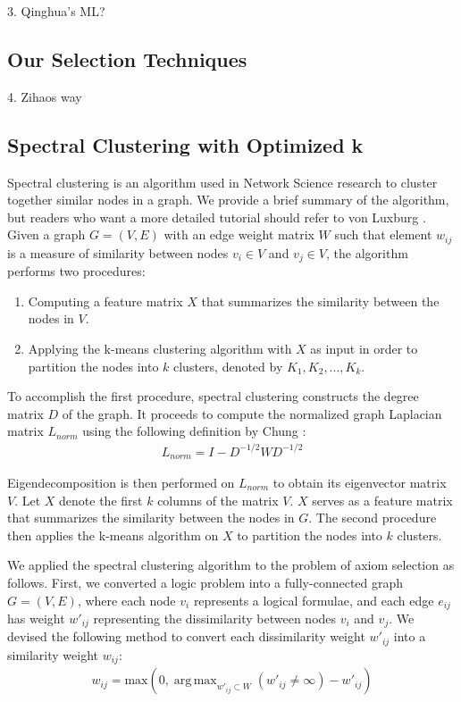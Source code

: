 \documentclass[EPiC]{easychair}
\DeclareMathOperator*{\argmaxA}{arg\,max} %
\begin{document}
3. Qinghua's ML?
\subsection{Our Selection Techniques}
\label{Zihao}

4. Zihaos way
\subsection{Spectral Clustering with Optimized k}
\label{Zishi}

Spectral clustering is an algorithm used in Network Science research to
cluster together similar nodes in a graph. We provide a brief summary of the
algorithm, but readers who want a more detailed tutorial should refer to
von Luxburg \cite{vonLuxburg2007}. 
Given a graph $G = (V, E)$ with an edge weight matrix $W$ such that element
$w_{ij}$ is a measure of similarity between nodes $v_{i} \in V$ and 
$v_{j} \in V$, the algorithm performs two procedures:
\begin{enumerate}
\item Computing a feature matrix $X$ that summarizes the similarity 
between the nodes in $V$.

\item Applying the k-means clustering algorithm with $X$ as input in order 
to partition the nodes into $k$ clusters, denoted by
$K_{1}, K_{2}, ..., K_{k}$.
\end{enumerate}

To accomplish the first procedure, spectral clustering constructs the 
degree matrix $D$ of the graph. It proceeds to compute the normalized 
graph Laplacian matrix $L_{norm}$ using the following definition by 
Chung \cite{Chung1997}:
\begin{align}
L_{norm} = I - D^{-1/2} W D^{-1/2}
\end{align}

Eigendecomposition is then performed on $L_{norm}$ to obtain its eigenvector
matrix $V$. Let $X$ denote the first $k$ columns of the matrix $V$. 
$X$ serves as a feature matrix that summarizes the similarity between the 
nodes in $G$. The second procedure then applies the k-means algorithm on $X$
to partition the nodes into $k$ clusters.

We applied the spectral clustering algorithm to the problem of axiom 
selection as follows. First, we converted a logic problem into a 
fully-connected graph $G = (V, E)$, where each node $v_{i}$ represents a 
logical formulae, and each edge $e_{ij}$ has weight $w'_{ij}$ representing 
the dissimilarity between nodes $v_{i}$ and $v_{j}$. We devised the following 
method to convert each dissimilarity weight $w'_{ij}$ into a similarity 
weight $w_{ij}$:
\begin{align}
w_{ij} = \textrm{max}(0, 
	\argmaxA_{w'_{ij} \subset W} (w'_{ij} \neq \infty) - w'_{ij})
\end{align}
\end{document}

